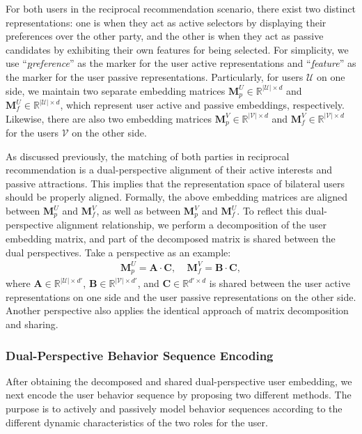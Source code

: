 For both users in the reciprocal recommendation scenario, there exist two distinct representations: one is when they act as active selectors by displaying their preferences over the other party, and the other is when they act as passive candidates by exhibiting their own features for being selected.
For simplicity, we use ``\emph{\underline{p}reference}'' as the marker for the user active representations and ``\emph{\underline{f}eature}'' as the marker for the user passive representations.
Particularly, for users $\mathcal{U}$ on one side, we maintain two separate embedding matrices $\bm{M}^{U}_{p} \in \mathbb{R}^{|\mathcal{U}| \times d}$ and $\bm{M}^{U}_{f} \in \mathbb{R}^{|\mathcal{U}| \times d}$, which represent user active and passive embeddings, respectively. Likewise, there are also two embedding matrices $\bm{M}^{V}_{p} \in \mathbb{R}^{|\mathcal{V}| \times d}$ and $\bm{M}^{V}_{f} \in \mathbb{R}^{|\mathcal{V}| \times d}$ for the users $\mathcal{V}$ on the other side.

As discussed previously, the matching of both parties in reciprocal recommendation is a dual-perspective alignment of their active interests and passive attractions.
This implies that the representation space of bilateral users should be properly aligned.
Formally, the above embedding matrices are aligned between $\bm{M}^{U}_{p}$ and $\bm{M}^{V}_{f}$, as well as between $\bm{M}^{V}_{p}$ and $\bm{M}^{U}_{f}$.
To reflect this dual-perspective alignment relationship, we perform a decomposition of the user embedding matrix, and part of the decomposed matrix is shared between the dual perspectives. Take a perspective as an example:
\begin{align}
    \bm{M}^{U}_{p} = \bm{A} \cdot \bm{C}, \ \ \ \ \
    \bm{M}^{V}_{f} = \bm{B} \cdot \bm{C},
    \label{eq:decomp}
\end{align}
where $\bm{A} \in \mathbb{R}^{|\mathcal{U}| \times {d'} }$, $\bm{B} \in \mathbb{R}^{|\mathcal{V}| \times {d'}}$, and $\bm{C} \in \mathbb{R}^{{d'} \times d}$ is shared between the user active representations on one side and the user passive representations on the other side. Another perspective also applies the identical approach of matrix decomposition and sharing.


\subsubsection{Dual-Perspective Behavior Sequence Encoding}
\label{sec:seq_encode}
After obtaining the decomposed and shared dual-perspective user embedding, we next encode the user behavior sequence by proposing two different methods. The purpose is to actively and passively model behavior sequences according to the different dynamic characteristics of the two roles for the user.

